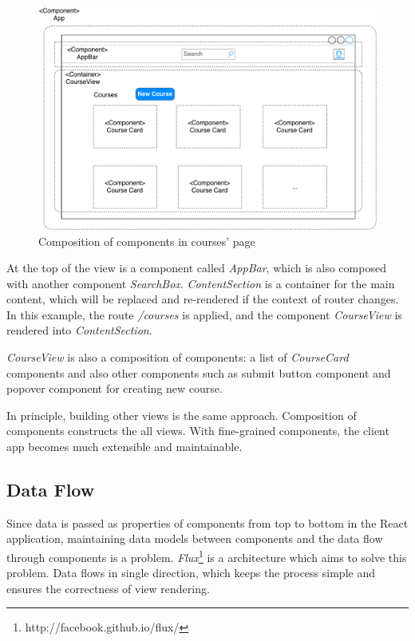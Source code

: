 \begin{figure}[!htbp]
  \centering
    \includegraphics[width=1\textwidth]{Figures/imp-course-view-composition.pdf}
  \caption{Composition of components in courses' page}
  \label{fig:course-view-composition-imp}
\end{figure}

At the top of the view is a component called \textit{AppBar}, which is also composed with another component \textit{SearchBox}. \textit{ContentSection} is a container for the main content, which will be replaced and re-rendered if the context of router changes. In this example, the route \textit{/courses} is applied, and the component \textit{CourseView} is rendered into \textit{ContentSection}. 

\textit{CourseView} is also a composition of components: a list of \textit{CourseCard} components and also other components such as submit button component and popover component for creating new course. 

In principle, building other views is the same approach. Composition of components constructs the all views. With fine-grained components, the client app becomes much extensible and maintainable.


\subsection{Data Flow}\label{subsection:data-flow-react-imp}

Since data is passed as properties of components from top to bottom in the React application, maintaining data models between components and the data flow through components is a problem. \textit{Flux}\footnote{http://facebook.github.io/flux/} is a architecture which aims to solve this problem. Data flows in single direction, which keeps the process simple and ensures the correctness of view rendering.

